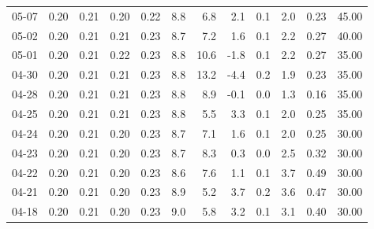 \begin{threeparttable}
{\begin{tabular}{lrrrrrrrrrrr}
  05-07 &          0.20 &          0.21 &          0.20 &        0.22 &                 8.8 &                 6.8 &        2.1 &                 0.1 &              2.0 &            0.23 &                  45.00 \\
  05-02 &          0.20 &          0.21 &          0.21 &        0.23 &                 8.7 &                 7.2 &        1.6 &                 0.1 &              2.2 &            0.27 &                  40.00 \\
  05-01 &          0.20 &          0.21 &          0.22 &        0.23 &                 8.8 &                10.6 &       -1.8 &                 0.1 &              2.2 &            0.27 &                  35.00 \\
  04-30 &          0.20 &          0.21 &          0.21 &        0.23 &                 8.8 &                13.2 &       -4.4 &                 0.2 &              1.9 &            0.23 &                  35.00 \\
  04-28 &          0.20 &          0.21 &          0.21 &        0.23 &                 8.8 &                 8.9 &       -0.1 &                 0.0 &              1.3 &            0.16 &                  35.00 \\
  04-25 &          0.20 &          0.21 &          0.21 &        0.23 &                 8.8 &                 5.5 &        3.3 &                 0.1 &              2.0 &            0.25 &                  35.00 \\
  04-24 &          0.20 &          0.21 &          0.20 &        0.23 &                 8.7 &                 7.1 &        1.6 &                 0.1 &              2.0 &            0.25 &                  30.00 \\
  04-23 &          0.20 &          0.21 &          0.20 &        0.23 &                 8.7 &                 8.3 &        0.3 &                 0.0 &              2.5 &            0.32 &                  30.00 \\
  04-22 &          0.20 &          0.21 &          0.20 &        0.23 &                 8.6 &                 7.6 &        1.1 &                 0.1 &              3.7 &            0.49 &                  30.00 \\
  04-21 &          0.20 &          0.21 &          0.20 &        0.23 &                 8.9 &                 5.2 &        3.7 &                 0.2 &              3.6 &            0.47 &                  30.00 \\
  04-18 &          0.20 &          0.21 &          0.20 &        0.23 &                 9.0 &                 5.8 &        3.2 &                 0.1 &              3.1 &            0.40 &                  30.00 \\

\end{tabular}}
\end{threeparttable}
